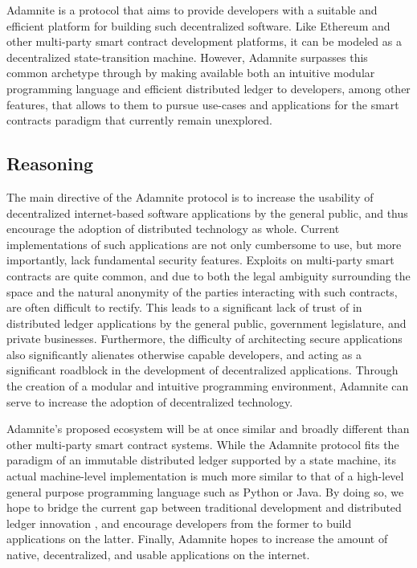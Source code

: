 \documentclass[conference]{IEEEtran}
\begin{document}
Adamnite is a protocol that aims to provide developers with a suitable and efficient platform for building such decentralized software. Like Ethereum and other multi-party smart contract development platforms, it can be modeled as a decentralized state-transition machine. However, Adamnite surpasses this common archetype through by making available both an intuitive modular programming language and efficient distributed ledger to developers, among other features, that allows to them to pursue use-cases and applications for the smart contracts paradigm that currently remain unexplored.

\subsection{Reasoning}

The main directive of the Adamnite protocol is to increase the usability of decentralized internet-based software applications by the general public, and thus encourage the adoption of distributed technology as whole. Current implementations of such applications are not only cumbersome to use, but more importantly, lack fundamental security features. Exploits on multi-party smart contracts are quite common, and due to both the legal ambiguity surrounding the space and the natural anonymity of the parties interacting with such contracts, are often difficult to rectify. This leads to a significant lack of trust of in distributed ledger applications by the general public, government legislature, and private businesses. Furthermore, the difficulty of architecting secure applications also significantly alienates  otherwise capable developers, and acting as a significant roadblock in the development of decentralized applications. Through the creation of a modular and intuitive programming environment, Adamnite can serve to increase the adoption of decentralized technology.

Adamnite's proposed ecosystem will be at once similar and broadly different than other multi-party smart contract systems. While the Adamnite protocol fits the paradigm of an immutable distributed ledger supported by a state machine, its actual machine-level implementation is much more similar to that of a high-level general purpose programming language such as Python or Java. By doing so, we hope to bridge the current gap between traditional development and distributed ledger innovation , and encourage developers from the former to build applications on the latter. Finally, Adamnite hopes to increase the amount of native, decentralized, and usable applications on the internet.
\end{document}
